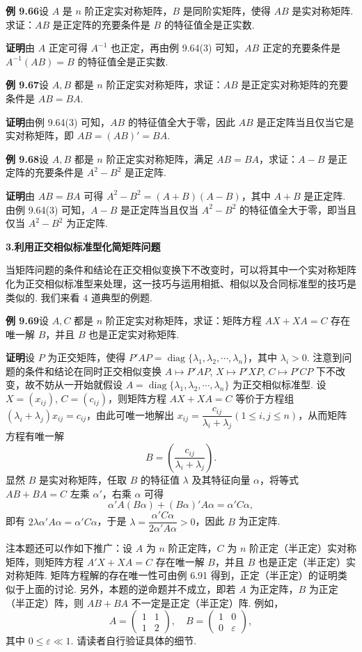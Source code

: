 \documentclass[UTF8, 12pt, fontset=fandol, oneside]{ctexart}
\begin{document}
\noindent\textbf{例 9.66}\quad 设 $A$ 是 $n$ 阶正定实对称矩阵，$B$ 是同阶实矩阵，使得 $AB$ 是实对称矩阵. 求证：$AB$ 是正定阵的充要条件是 $B$ 的特征值全是正实数.

\noindent\textbf{证明}\quad 由 $A$ 正定可得 $A^{-1}$ 也正定，再由例 9.64(3) 可知，$AB$ 正定的充要条件是 $A^{-1}(AB)=B$ 的特征值全是正实数.

\noindent\textbf{例 9.67}\quad 设 $A,B$ 都是 $n$ 阶正定实对称矩阵，求证：$AB$ 是正定实对称矩阵的充要条件是 $AB=BA$.

\noindent\textbf{证明}\quad 由例 9.64(3) 可知，$AB$ 的特征值全大于零，因此 $AB$ 是正定阵当且仅当它是实对称矩阵，即 $AB=(AB)'=BA$.

\noindent\textbf{例 9.68}\quad 设 $A,B$ 都是 $n$ 阶正定实对称矩阵，满足 $AB=BA$，求证：$A-B$ 是正定阵的充要条件是 $A^2-B^2$ 是正定阵.

\noindent\textbf{证明}\quad 由 $AB=BA$ 可得 $A^2-B^2=(A+B)(A-B)$，其中 $A+B$ 是正定阵. 由例 9.64(3) 可知，$A-B$ 是正定阵当且仅当 $A^2-B^2$ 的特征值全大于零，即当且仅当 $A^2-B^2$ 为正定阵.

\noindent\textbf{3.\quad 利用正交相似标准型化简矩阵问题}

当矩阵问题的条件和结论在正交相似变换下不改变时，可以将其中一个实对称矩阵化为正交相似标准型来处理，这一技巧与运用相抵、相似以及合同标准型的技巧是类似的. 我们来看 4 道典型的例题.

\noindent\textbf{例 9.69}\quad 设 $A,C$ 都是 $n$ 阶正定实对称矩阵，求证：矩阵方程 $AX+XA=C$ 存在唯一解 $B$，并且 $B$ 也是正定实对称矩阵.

\noindent\textbf{证明}\quad 设 $P$ 为正交矩阵，使得 $P'AP=\operatorname{diag}\{\lambda_1,\lambda_2,\cdots,\lambda_n\}$，其中 $\lambda_i>0$. 注意到问题的条件和结论在同时正交相似变换 $A\mapsto P'AP$, $X\mapsto P'XP$, $C\mapsto P'CP$ 下不改变，故不妨从一开始就假设 $A=\operatorname{diag}\{\lambda_1,\lambda_2,\cdots,\lambda_n\}$ 为正交相似标准型. 设 $X=(x_{ij})$, $C=(c_{ij})$，则矩阵方程 $AX+XA=C$ 等价于方程组 $(\lambda_i+\lambda_j)x_{ij}=c_{ij}$，由此可唯一地解出 $x_{ij}=\dfrac{c_{ij}}{\lambda_i+\lambda_j}(1\le i,j\le n)$，从而矩阵方程有唯一解
\[
B=\left(\frac{c_{ij}}{\lambda_i+\lambda_j}\right).
\]
显然 $B$ 是实对称矩阵，任取 $B$ 的特征值 $\lambda$ 及其特征向量 $\alpha$，将等式 $AB+BA=C$ 左乘 $\alpha'$，右乘 $\alpha$ 可得
\[
\alpha'A(B\alpha)+(B\alpha)'A\alpha=\alpha'C\alpha,
\]
即有 $2\lambda\alpha'A\alpha=\alpha'C\alpha$，于是 $\lambda=\dfrac{\alpha'C\alpha}{2\alpha'A\alpha}>0$，因此 $B$ 为正定阵.

注\quad 本题还可以作如下推广：设 $A$ 为 $n$ 阶正定阵，$C$ 为 $n$ 阶正定（半正定）实对称矩阵，则矩阵方程 $A'X+XA=C$ 存在唯一解 $B$，并且 $B$ 也是正定（半正定）实对称矩阵. 矩阵方程解的存在唯一性可由例 6.91 得到，正定（半正定）的证明类似于上面的讨论. 另外，本题的逆命题并不成立，即若 $A$ 为正定阵，$B$ 为正定（半正定）阵，则 $AB+BA$ 不一定是正定（半正定）阵. 例如，
\[
A=\begin{pmatrix}1&1\\1&2\end{pmatrix},\quad
B=\begin{pmatrix}1&0\\0&\varepsilon\end{pmatrix},
\]
其中 $0\le\varepsilon\ll1$. 请读者自行验证具体的细节.
\end{document}
